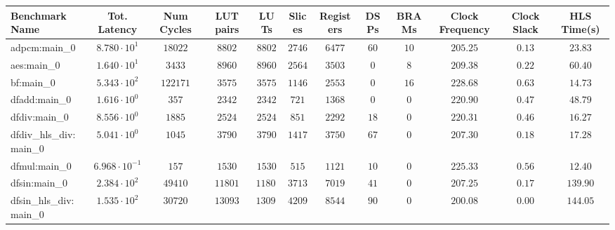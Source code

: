 \begin{tabular}{|l|c|c|c|c|c|c|c|c|c|c|c|}
\hline
Benchmark Name          & Tot. Latency            & Num Cycles & LUT pairs & LUTs      & Slices    & Registers & DSPs    & BRAMs   & Clock Frequency & Clock Slack & HLS Time(s) \\
\hline
adpcm:main\_0           & $ 8.780 \cdot 10^{1}  $ & $ 18022  $ & $ 8802  $ & $ 8802  $ & $ 2746  $ & $ 6477  $ & $ 60  $ & $ 10  $ & $ 205.25      $ & $ 0.13    $ & $ 23.83   $ \\
aes:main\_0             & $ 1.640 \cdot 10^{1}  $ & $ 3433   $ & $ 8960  $ & $ 8960  $ & $ 2564  $ & $ 3503  $ & $ 0   $ & $ 8   $ & $ 209.38      $ & $ 0.22    $ & $ 60.40   $ \\
bf:main\_0              & $ 5.343 \cdot 10^{2}  $ & $ 122171 $ & $ 3575  $ & $ 3575  $ & $ 1146  $ & $ 2553  $ & $ 0   $ & $ 16  $ & $ 228.68      $ & $ 0.63    $ & $ 14.73   $ \\
dfadd:main\_0           & $ 1.616 \cdot 10^{0}  $ & $ 357    $ & $ 2342  $ & $ 2342  $ & $ 721   $ & $ 1368  $ & $ 0   $ & $ 0   $ & $ 220.90      $ & $ 0.47    $ & $ 48.79   $ \\
dfdiv:main\_0           & $ 8.556 \cdot 10^{0}  $ & $ 1885   $ & $ 2524  $ & $ 2524  $ & $ 851   $ & $ 2292  $ & $ 18  $ & $ 0   $ & $ 220.31      $ & $ 0.46    $ & $ 16.27   $ \\
dfdiv\_hls\_div:main\_0 & $ 5.041 \cdot 10^{0}  $ & $ 1045   $ & $ 3790  $ & $ 3790  $ & $ 1417  $ & $ 3750  $ & $ 67  $ & $ 0   $ & $ 207.30      $ & $ 0.18    $ & $ 17.28   $ \\
dfmul:main\_0           & $ 6.968 \cdot 10^{-1} $ & $ 157    $ & $ 1530  $ & $ 1530  $ & $ 515   $ & $ 1121  $ & $ 10  $ & $ 0   $ & $ 225.33      $ & $ 0.56    $ & $ 12.40   $ \\
dfsin:main\_0           & $ 2.384 \cdot 10^{2}  $ & $ 49410  $ & $ 11801 $ & $ 11801 $ & $ 3713  $ & $ 7019  $ & $ 41  $ & $ 0   $ & $ 207.25      $ & $ 0.17    $ & $ 139.90  $ \\
dfsin\_hls\_div:main\_0 & $ 1.535 \cdot 10^{2}  $ & $ 30720  $ & $ 13093 $ & $ 13093 $ & $ 4209  $ & $ 8544  $ & $ 90  $ & $ 0   $ & $ 200.08      $ & $ 0.00    $ & $ 144.05  $ \\

\end{tabular}
